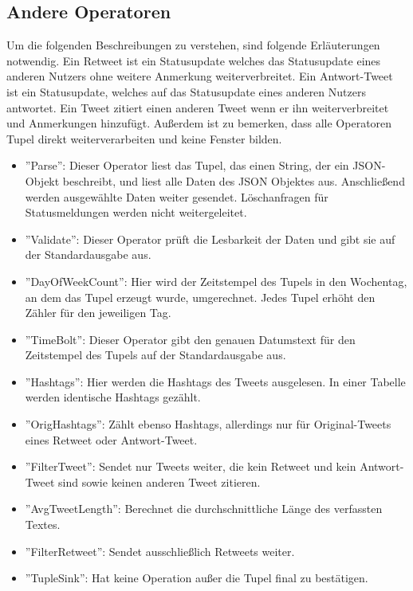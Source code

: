 \subsection{Andere Operatoren}

Um die folgenden Beschreibungen zu verstehen, sind folgende Erläuterungen notwendig.
Ein Retweet ist ein Statusupdate welches das Statusupdate eines anderen Nutzers ohne weitere Anmerkung weiterverbreitet.
Ein Antwort-Tweet ist ein Statusupdate, welches auf das Statusupdate eines anderen Nutzers antwortet.
Ein Tweet zitiert einen anderen Tweet wenn er ihn weiterverbreitet und Anmerkungen hinzufügt.
Außerdem ist zu bemerken, dass alle Operatoren Tupel direkt weiterverarbeiten und keine Fenster bilden.

\begin{itemize}
\item{''Parse'': Dieser Operator liest das Tupel, das einen String, der ein JSON-Objekt beschreibt, und liest alle Daten des JSON Objektes aus. Anschließend werden ausgewählte Daten weiter gesendet. Löschanfragen für Statusmeldungen werden nicht weitergeleitet.}
\item{''Validate'': Dieser Operator prüft die Lesbarkeit der Daten und gibt sie auf der Standardausgabe aus.}
\item{''DayOfWeekCount'': Hier wird der Zeitstempel des Tupels in den Wochentag, an dem das Tupel erzeugt wurde, umgerechnet. Jedes Tupel erhöht den Zähler für den jeweiligen Tag.}
\item{''TimeBolt'': Dieser Operator gibt den genauen Datumstext für den Zeitstempel des Tupels auf der Standardausgabe aus.}
\item{''Hashtags'': Hier werden die Hashtags des Tweets ausgelesen. In einer Tabelle werden identische Hashtags gezählt.}
\item{''OrigHashtags'': Zählt ebenso Hashtags, allerdings nur für Original-Tweets eines Retweet oder Antwort-Tweet.}
\item{''FilterTweet'': Sendet nur Tweets weiter, die kein Retweet und kein Antwort-Tweet sind sowie keinen anderen Tweet zitieren.}
\item{''AvgTweetLength'': Berechnet die durchschnittliche Länge des verfassten Textes.}
\item{''FilterRetweet'': Sendet ausschließlich Retweets weiter.}
\item{''TupleSink'': Hat keine Operation außer die Tupel final zu bestätigen.}
\end{itemize}

